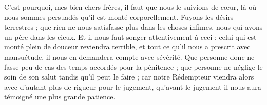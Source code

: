 C’est pourquoi, mes bien chers frères, il faut que nous le suivions de cœur, là où nous sommes persuadés qu’il est monté corporellement. Fuyons les désirs terrestres ; que rien ne nous satisfasse plus dans les choses infimes, nous qui avons un père dans les cieux. Et il nous faut songer attentivement à ceci : celai qui est monté plein de douceur reviendra terrible, et tout ce qu’il nous a prescrit avec mansuétude, il nous en demandera compte avec sévérité. Que personne donc ne fasse peu de cas des temps accordés pour la pénitence ; que personne ne néglige le soin de son salut tandis qu’il peut le faire ; car notre Rédempteur viendra alors avec d’autant plus de rigueur pour le jugement, qu’avant le jugement il nous aura témoigné une plus grande patience.